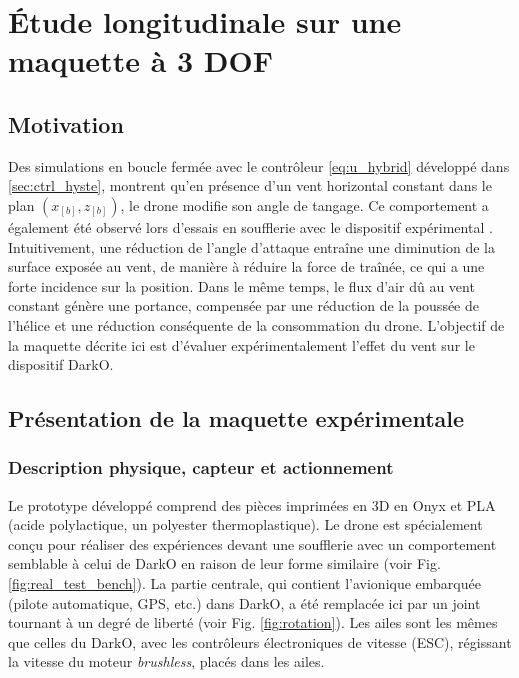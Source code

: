 \chapter{Étude longitudinale sur une maquette à 3 DOF}
\minitoc
\label{chap:3DOF}

\section{Motivation}
\label{sec:motivation3DOF}
Des simulations en boucle fermée avec le contrôleur \eqref{eq:u_hybrid} développé dans \ref{sec:ctrl_hyste}, montrent qu'en présence d'un vent horizontal constant dans le plan $(x_{[b]},z_{[b]})$, le drone modifie son angle de tangage. Ce comportement a également été observé lors d'essais en soufflerie avec le dispositif expérimental \cite{olszaneckibarthHal-02542982}. Intuitivement, une réduction de l'angle d'attaque entraîne une diminution de la surface exposée au vent, de manière à réduire la force de traînée, ce qui a une forte incidence sur la position. Dans le même temps, le flux d'air dû au vent constant génère une portance, compensée par une réduction de la poussée de l'hélice et une réduction conséquente de la consommation du drone. L'objectif de la maquette décrite ici est d'évaluer expérimentalement l'effet du vent sur le dispositif DarkO.


\section{Présentation de la maquette expérimentale}
\label{sec:test_bench}



\subsection{Description physique, capteur et actionnement}
Le prototype développé comprend des pièces imprimées en 3D en Onyx et PLA   (acide polylactique, un polyester thermoplastique). Le drone est spécialement conçu pour réaliser des expériences devant une soufflerie avec un comportement semblable à celui de DarkO en raison de leur forme similaire (voir Fig. \ref{fig:real_test_bench}). La partie centrale, qui contient l'avionique embarquée (pilote automatique, GPS, etc.) dans DarkO, a été remplacée ici par un joint tournant à un degré de liberté (voir Fig. \ref{fig:rotation}). Les ailes sont les mêmes que celles du DarkO, avec les contrôleurs électroniques de vitesse (ESC), régissant la vitesse du moteur \textit{brushless}, placés dans les ailes.

